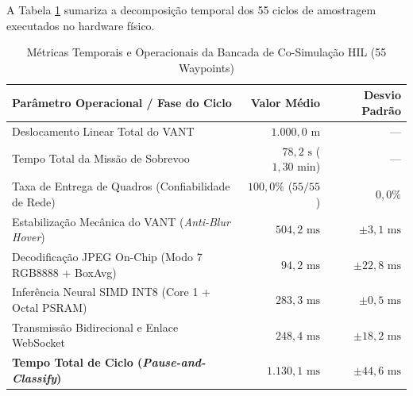 A Tabela \ref{tab:metricas_hil} sumariza a decomposição temporal dos 55 ciclos de amostragem executados no hardware físico.

\begin{table}[htbp]
\centering
\caption{Métricas Temporais e Operacionais da Bancada de Co-Simulação HIL (55 Waypoints)}
\label{tab:metricas_hil}
\small
\begin{tabular}{p{8.5cm}rr}
\hline
\textbf{Parâmetro Operacional / Fase do Ciclo} & \textbf{Valor Médio} & \textbf{Desvio Padrão} \\ \hline
Deslocamento Linear Total do VANT & $1.000,0\text{ m}$ & --- \\
Tempo Total da Missão de Sobrevoo & $78,2\text{ s}$ ($1,30\text{ min}$) & --- \\
Taxa de Entrega de Quadros (Confiabilidade de Rede) & $100,0\%$ ($55/55$) & $0,0\%$ \\
Estabilização Mecânica do VANT (\textit{Anti-Blur Hover}) & $504,2\text{ ms}$ & $\pm 3,1\text{ ms}$ \\
Decodificação JPEG On-Chip (Modo 7 RGB8888 + BoxAvg) & $94,2\text{ ms}$ & $\pm 22,8\text{ ms}$ \\
Inferência Neural SIMD INT8 (Core 1 + Octal PSRAM) & $283,3\text{ ms}$ & $\pm 0,5\text{ ms}$ \\
Transmissão Bidirecional e Enlace WebSocket & $248,4\text{ ms}$ & $\pm 18,2\text{ ms}$ \\ \hline
\textbf{Tempo Total de Ciclo (\textit{Pause-and-Classify})} & \textbf{$1.130,1\text{ ms}$} & $\pm 44,6\text{ ms}$ \\ \hline
\end{tabular}
\end{table}

